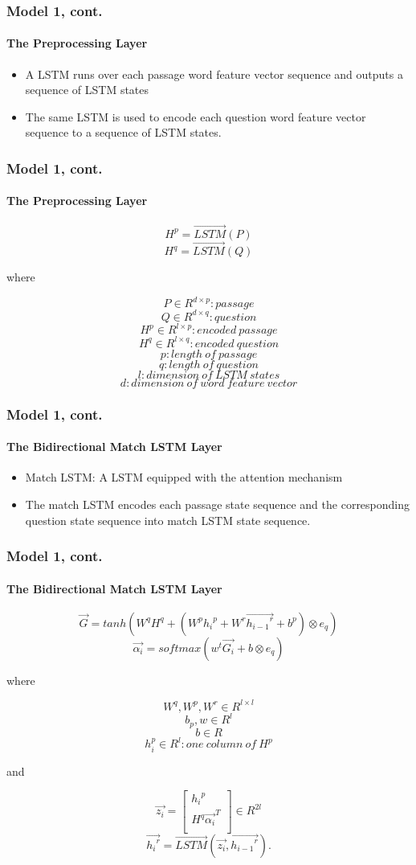 \documentclass{beamer}
\begin{document}
\begin{frame} \frametitle{Model 1, cont.}\framesubtitle{The Preprocessing Layer}

    \begin{itemize}
        \item A LSTM runs over each passage word feature vector sequence and outputs a sequence of LSTM states
        \item The same LSTM is used to encode each question word feature vector sequence to a sequence of LSTM states.
    \end{itemize}
\end{frame}

\begin{frame} \frametitle{Model 1, cont.}\framesubtitle{The Preprocessing Layer}
    $$H^p = \overrightarrow{LSTM}(P)$$
    $$H^q = \overrightarrow{LSTM}(Q)$$

    where

    $$P\in R^{d \times p}: passage$$
    $$Q\in R^{d \times q}: question$$
    $$H^p\in R^{l \times p}: encoded\ passage$$
    $$H^q\in R^{l \times q}: encoded\ question$$
    $$p: length \ of\ passage$$
    $$q: length\ of\ question$$
    $$l: dimension\ of\ LSTM\ states$$
    $$d: dimension\ of\ word\ feature\ vector$$

\end{frame}

\begin{frame} \frametitle{Model 1, cont.}\framesubtitle{The Bidirectional Match LSTM Layer}
    \begin{itemize}
        \item Match LSTM: A LSTM equipped with the attention mechanism
        \item The match LSTM encodes each passage state sequence and the corresponding question state sequence into match LSTM state sequence.
    \end{itemize}
\end{frame}

\begin{frame} \frametitle{Model 1, cont.}\framesubtitle{The Bidirectional Match LSTM Layer}

    $$\overrightarrow{G} = tanh(W^qH^q + (W^p{h_i}^p + W^r\overrightarrow{{h_{i-1}}^r} + b^p) \otimes e_q)$$
    $$\overrightarrow{\alpha _i} = softmax(w^t\overrightarrow{G_i} + b \otimes e_q)$$


    where

    $$W^q, W^p, W^r\in R^{l \times l} $$
    $$b_p, w\in R^{l}  $$
    $$b \in R $$
    $${h_{i}^p}\in R^{l}: one\ column\ of\ H^p  $$

    and

    \[ \overrightarrow{z_i} =
    \begin{bmatrix}
    {h_i}^p \\
    H^q\overrightarrow{ {\alpha _i}}^T \\
    \end{bmatrix}
    \in R^{2l}
    \]
    $$\overrightarrow{{h_i}^r} = \overrightarrow{LSTM}(\overrightarrow{z_i}, \overrightarrow{{h_{i-1}}^r}).$$

\end{frame}
\end{document}
